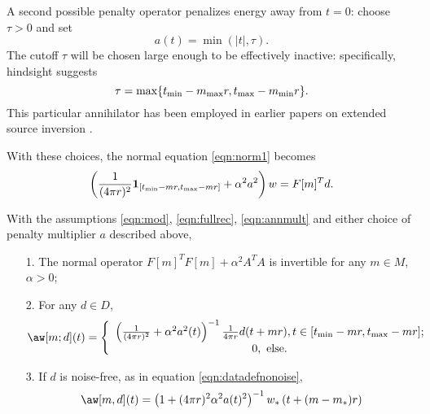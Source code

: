 A second possible
penalty operator penalizes energy away from
$t=0$: choose $\tau > 0$ and set
\begin{equation}
  \label{eqn:ann}
  a(t) = \min(|t|, \tau).
\end{equation}
The cutoff $\tau$ will be chosen large enough to be effectively inactive:
specifically, hindsight suggests
\begin{equation}
  \label{eqn:taudef}
  \tau = \max \{t_{\rm min}-m_{\rm max}r, t_{\rm max}-m_{\rm min}r\}.
\end{equation}
This
particular annihilator has been employed in earlier papers on extended
source inversion
\cite[]{Plessix:00a,LuoSava:11,Warner:14,HuangSymes:SEG15a,Warner:16,HuangSymes:GEO17}.

With these choices, the normal equation \ref{eqn:norm1} becomes
\begin{equation}
\label{eqn:norm2}
\left(\frac{1}{(4\pi r)^2}  {\bf 1}_{[t_{\rm min}-mr,  
      t_{\rm max}-mr]} + \alpha^2a^2\right)w= F[m]^Td.
\end{equation}

\begin{theorem}
  \label{thm:norminv}
  With the assumptions \ref{eqn:mod}, \ref{eqn:fullrec},
  \ref{eqn:annmult} and either choice of penalty multiplier $a$
  described above,
  \begin{itemize}
  \item[1. ]The normal operator $F[m]^TF[m] + \alpha^2A^TA$ is
    invertible for any $m \in M$, $\alpha > 0$;
  \item[2. ] For any $d \in D$,
    \begin{equation}
      \aw[m;d](t) = \left\{
        \begin{array}{c}
          \left(\frac{1}{(4\pi r)^2} + \alpha^2
          a^2(t)\right)^{-1}\frac{1}{4 \pi r}d(t+mr), t \in [t_{\rm
          min}-mr, t_{\rm max}-mr];\\
          0, \mbox{ else.}
        \end{array}
      \right.
    \end{equation}
  \item[3. ] If $d$ is noise-free, as in equation
    \ref{eqn:datadefnonoise},
    \begin{equation}
      \label{eqn:solnnon}
      \aw[m,d](t)= \left(1+ (4\pi r)^2\alpha^2 a(t)^2\right)^{-1}w_*\left(t+(m-m_*)r\right) 
    \end{equation}
  \end{itemize}
\end{theorem}


